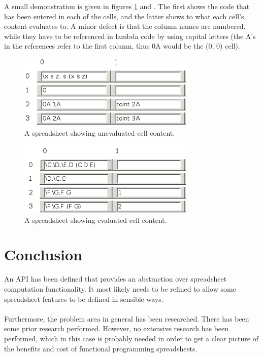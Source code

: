 \documentclass[10pt,a4paper]{article}
\begin{document}
A small demonstration is given in figures \ref{FPContent} and . The first shows the code that has
been entered in each of the cells, and the latter shows to what each cell's content evaluates to.
A minor defect is that the column names are numbered, while they have to be referenced in lambda code
by using capital letters (the A's in the references refer to the first column, thus 0A would be the
(0, 0) cell).
\begin{figure}[H]
  \centering
  \includegraphics[width=0.75\textwidth]{FPContent}
  \caption{A spreadsheet showing unevaluated cell content.}
  \label{FPContent}
\end{figure}
\begin{figure}[H]
  \centering
  \includegraphics[width=0.75\textwidth]{FPResult}
  \caption{A spreadsheet showing evaluated cell content.}
  \label{FPResult}
\end{figure}

\clearpage
\section{Conclusion}
An API has been defined that provides an abstraction over spreadsheet computation functionality.
It most likely needs to be refined to allow some spreadsheet features to be defined in
sensible ways.
\\\\
Furthermore, the problem area in general has been researched. There has been some prior research
performed. However, no extensive research has been performed, which in this case is probably
needed in order to get a clear picture of the benefits and cost of functional programming spreadsheets.
\end{document}
